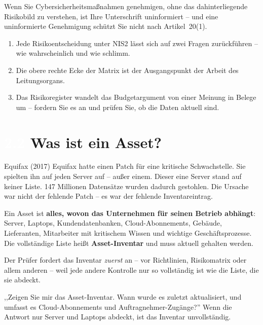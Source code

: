 \documentclass[11pt,a4paper,twoside]{book}
\newcommand{\lessontag}[1]{%
  \texorpdfstring{%
    \setlength{\fboxsep}{3pt}\colorbox{nisd2blue}{\textcolor{white}{\footnotesize\bfseries #1}}\quad%
  }{Lektion #1\ }%
}
\begin{document}
Wenn Sie Cybersicherheitsmaßnahmen genehmigen, ohne das dahinterliegende Risikobild zu verstehen, ist Ihre Unterschrift uninformiert -- und eine uninformierte Genehmigung schützt Sie nicht nach Artikel~20(1).

\begin{keytakeaways}
\begin{enumerate}
  \item Jede Risikoentscheidung unter NIS2 lässt sich auf zwei Fragen zurückführen -- wie wahrscheinlich und wie schlimm.
  \item Die obere rechte Ecke der Matrix ist der Ausgangspunkt der Arbeit des Leitungsorgans.
  \item Das Risikoregister wandelt das Budgetargument von einer Meinung in Belege um -- fordern Sie es an und prüfen Sie, ob die Daten aktuell sind.
\end{enumerate}
\end{keytakeaways}

\section{\lessontag{2.2}Was ist ein Asset?}

\begin{casestudy}{Equifax (2017)}
Equifax hatte einen Patch für eine kritische Schwachstelle. Sie spielten ihn auf jeden Server auf -- außer einem. Dieser eine Server stand auf keiner Liste. 147 Millionen Datensätze wurden dadurch gestohlen. Die Ursache war nicht der fehlende Patch -- es war der fehlende Inventareintrag.
\end{casestudy}

Ein Asset ist \textbf{alles, wovon das Unternehmen für seinen Betrieb abhängt}: Server, Laptops, Kundendatenbanken, Cloud-Abonnements, Gebäude, Lieferanten, Mitarbeiter mit kritischem Wissen und wichtige Geschäftsprozesse. Die vollständige Liste heißt \textbf{Asset-Inventar} und muss aktuell gehalten werden.

Der Prüfer fordert das Inventar \emph{zuerst} an -- vor Richtlinien, Risikomatrix oder allem anderen -- weil jede andere Kontrolle nur so vollständig ist wie die Liste, die sie abdeckt.

\begin{actionbox}
,,Zeigen Sie mir das Asset-Inventar. Wann wurde es zuletzt aktualisiert, und umfasst es Cloud-Abonnements und Auftragnehmer-Zugänge?'' Wenn die Antwort nur Server und Laptops abdeckt, ist das Inventar unvollständig.
\end{actionbox}
\end{document}
